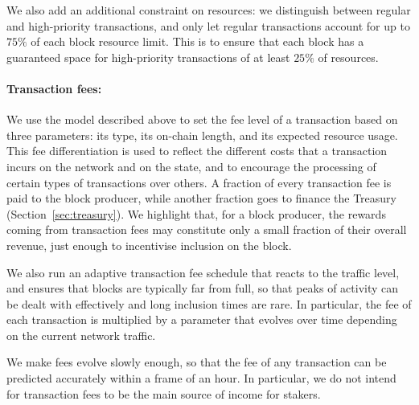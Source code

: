 We also add an additional constraint on resources: we distinguish between regular and high-priority transactions, and only let regular transactions account for up to $75\%$ of each block resource limit. This is to ensure that each block has a guaranteed space for high-priority transactions of at least $25\%$ of resources.

\paragraph{Transaction fees:} We use the model described above to set the fee level of a transaction based on three parameters: its type, its on-chain length, and its expected resource usage. This fee differentiation is used to reflect the different costs that a transaction incurs on the network and on the state, and to encourage the processing of certain types of transactions over others. A fraction of every transaction fee is paid to the block producer, while another fraction goes to finance the Treasury (Section~\ref{sec:treasury}). We highlight that, for a block producer, the rewards coming from transaction fees may constitute only a small fraction of their overall revenue, just enough to incentivise inclusion on the block.

We also run an adaptive transaction fee schedule that reacts to the traffic level, and ensures that blocks are typically far from full, so that peaks of activity can be dealt with effectively and long inclusion times are rare. In particular, the fee of each transaction is multiplied by a parameter that evolves over time depending on the current network traffic. 

 

We make fees evolve slowly enough, so that the fee of any transaction can be predicted accurately within a frame of an hour. In particular, we do not intend for transaction fees to be the main source of income for stakers.



